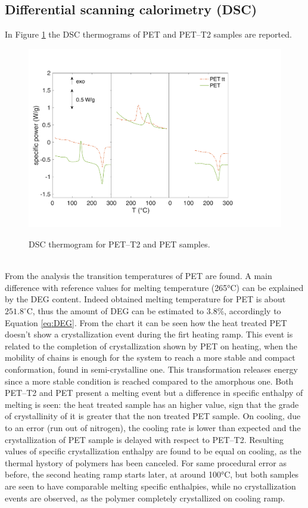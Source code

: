\documentclass[a4paper, 11pt]{article}
\begin{document}
\newpage

\subsection{Differential scanning calorimetry (DSC)}

In Figure \ref{fig:dscPET} the DSC thermograms of PET and PET–T2 samples are reported. 
\begin{figure}[htp]
\centering
{\includegraphics[scale=0.4]{dscPET}} 
\captionsetup{justification=centering}
\caption{DSC thermogram for PET–T2 and PET samples.}
\label{fig:dscPET}
\end{figure}\\
From the analysis the transition temperatures of PET are found. A main difference with reference values for melting temperature (265°C) can be explained by the DEG content. Indeed obtained melting temperature for PET is about $251.8^\circ$C, thus the amount of DEG can be estimated to 3.8\%, accordingly to Equation \ref{eq:DEG}. 
From the chart it can be seen how the heat treated PET doesn't show a crystallization event during the firt heating ramp. This event is related to the completion of crystallization shown by PET on heating, when the mobility of chains is enough for the system to reach a more stable and compact conformation, found in semi-crystalline one. This transformation releases energy since a more stable condition is reached compared to the amorphous one. Both PET–T2 and PET present a melting event but a difference in specific enthalpy of melting is seen: the heat treated sample has an higher value, sign that the grade of crystallinity of it is greater that the non treated PET sample. On cooling, due to an error (run out of nitrogen), the cooling rate is lower than expected and the crystallization of PET sample is delayed with respect to PET–T2. Resulting values of specific crystallization enthalpy are found to be equal on cooling, as the thermal hystory of polymers has been canceled. For same procedural error as before, the second heating ramp starts later, at around 100°C, but both samples are seen to have comparable melting specific enthalpies, while no crystallization events are observed, as the polymer completely crystallized on cooling ramp. 
\newpage
\end{document}
